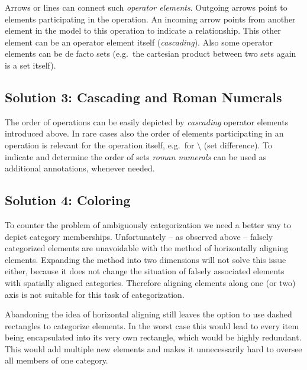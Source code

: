 \documentclass[twoside, openright, 12pt]{book}
\begin{document}
Arrows or lines can connect such \textit{operator elements}.
Outgoing arrows point to elements participating in the operation.
An incoming arrow points from another element in the model to this operation to indicate a relationship.
This other element can be an operator element itself (\textit{cascading}).
Also some operator elements can be de facto sets (e.g.\ the cartesian product between two sets again is a set itself).



\subsection{Solution 3: Cascading and Roman Numerals}
The order of operations can be easily depicted by \textit{cascading} operator elements introduced above.
In rare cases also the order of elements participating in an operation is relevant for the operation itself, e.g.\ for $\setminus$ (set difference).
To indicate and determine the order of sets \textit{roman numerals} can be used as additional annotations, whenever needed.



\subsection{Solution 4: Coloring}
\label{solution_coloring}
To counter the problem of ambiguously categorization we need a better way to depict category memberships.
Unfortunately -- as observed above -- falsely categorized elements are unavoidable with the method of horizontally aligning elements.
Expanding the method into two dimensions will not solve this issue either, because it does not change the situation of falsely associated elements with spatially aligned categories.
Therefore aligning elements along one (or two) axis is not suitable for this task of categorization.

Abandoning the idea of horizontal aligning still leaves the option to use dashed rectangles to categorize elements.
In the worst case this would lead to every item being encapsulated into its very own rectangle, which would be highly redundant.
This would add multiple new elements and makes it unnecessarily hard to oversee all members of one category.
\end{document}

